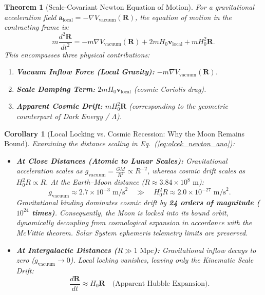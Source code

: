 \documentclass[11pt,a4paper]{article}
\newtheorem{theorem}{Theorem}[section]
\newtheorem{corollary}{Corollary}[theorem]
\begin{document}
\begin{theorem}[Scale-Covariant Newton Equation of Motion]
    \label{thm:olcek_newton_hareket_sc}
    For a gravitational acceleration field $\mathbf{a}_{\mathrm{local}} = -\nabla V_{\mathrm{vacuum}}(\mathbf{R})$, the equation of motion in the contracting frame is:
    \begin{equation}
        m \frac{d^2\mathbf{R}}{dt^2} = - m \nabla V_{\mathrm{vacuum}}(\mathbf{R}) + 2 m H_0 \mathbf{v}_{\mathrm{local}} + m H_0^2 \mathbf{R}.
        \label{eq:olcek_newton_ana}
    \end{equation}
    This encompasses three physical contributions:
    \begin{enumerate}
        \item \textbf{Vacuum Inflow Force (Local Gravity):} $-m \nabla V_{\mathrm{vacuum}}(\mathbf{R})$.
        \item \textbf{Scale Damping Term:} $2 m H_0 \mathbf{v}_{\mathrm{local}}$ (cosmic Coriolis drag).
        \item \textbf{Apparent Cosmic Drift:} $m H_0^2 \mathbf{R}$ (corresponding to the geometric counterpart of Dark Energy / $\Lambda$).
    \end{enumerate}
\end{theorem}

\begin{corollary}[Local Locking vs. Cosmic Recession: Why the Moon Remains Bound]
    \label{cor:yerel_kilitlenme_kozmik_kaciklik_sc}
    Examining the distance scaling in Eq.~(\ref{eq:olcek_newton_ana}):
    \begin{itemize}
        \item \textbf{At Close Distances (Atomic to Lunar Scales):} Gravitational acceleration scales as $g_{\mathrm{vacuum}} = \frac{GM}{R^2} \propto R^{-2}$, whereas cosmic drift scales as $H_0^2 R \propto R$. At the Earth--Moon distance ($R \approx 3.84 \times 10^8\text{ m}$):
              \begin{equation}
                  g_{\mathrm{vacuum}} \approx 2.7 \times 10^{-3}\text{ m/s}^2 \quad \gg \quad H_0^2 R \approx 2.0 \times 10^{-27}\text{ m/s}^2.
              \end{equation}
              Gravitational binding dominates cosmic drift by \textbf{24 orders of magnitude ($10^{24}$ times)}. Consequently, the Moon is locked into its bound orbit, dynamically decoupling from cosmological expansion in accordance with the McVittie theorem. Solar System ephemeris telemetry limits are preserved.
        \item \textbf{At Intergalactic Distances ($R \gg 1\text{ Mpc}$):} Gravitational inflow decays to zero ($g_{\mathrm{vacuum}} \to 0$). Local locking vanishes, leaving only the Kinematic Scale Drift:
              \begin{equation}
                  \frac{d\mathbf{R}}{dt} \approx H_0 \mathbf{R} \quad \text{(Apparent Hubble Expansion)}.
              \end{equation}
    \end{itemize}
\end{corollary}
\end{document}
